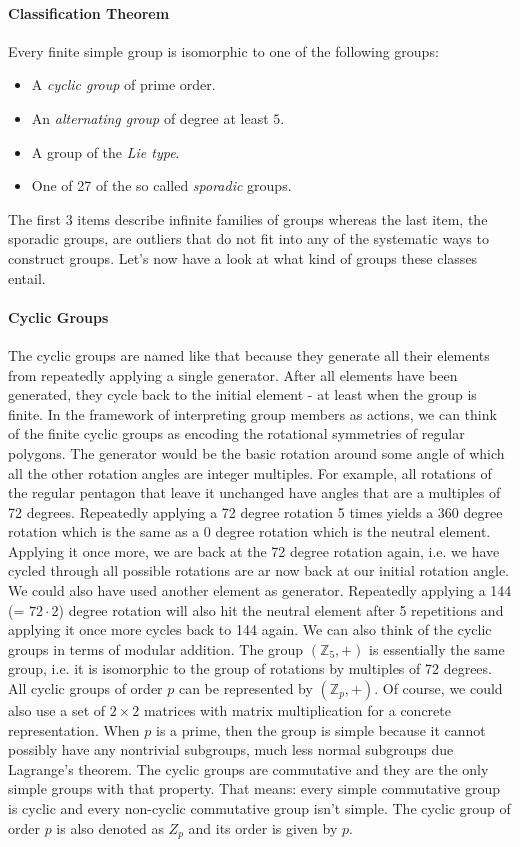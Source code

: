 \paragraph{Classification Theorem}
Every finite simple group is isomorphic to one of the following groups:
\begin{itemize}
\item A \emph{cyclic group} of prime order.
\item An \emph{alternating group} of degree at least $5$.
\item A group of the \emph{Lie type}.
\item One of 27 of the so called \emph{sporadic} groups.
\end{itemize}

The first 3 items describe infinite families of groups whereas the last item, the sporadic groups, are outliers that do not fit into any of the systematic ways to construct groups. Let's now have a look at what kind of groups these classes entail.

\paragraph{Cyclic Groups}
The cyclic groups are named like that because they generate all their elements from repeatedly applying a single generator. After all elements have been generated, they cycle back to the initial element - at least when the group is finite. In the framework of interpreting group members as actions, we can think of the finite cyclic groups as encoding the rotational symmetries of regular polygons. The generator would be the basic rotation around some angle of which all the other rotation angles are integer multiples. For example, all rotations of the regular pentagon that leave it unchanged have angles that are a multiples of 72 degrees. Repeatedly applying a 72 degree rotation 5 times yields a 360 degree rotation which is the same as a 0 degree rotation which is the neutral element. Applying it once more, we are back at the  72 degree rotation again, i.e. we have cycled through all possible rotations are ar now back at our initial rotation angle. We could also have used another element as generator. Repeatedly applying a 144 (= $72 \cdot 2$) degree rotation will also hit the neutral element after 5 repetitions and applying it once more cycles back to 144 again. We can also think of the cyclic groups in terms of modular addition. The group $(\mathbb{Z}_5, +)$ is essentially the same group, i.e. it is isomorphic to the group of rotations by multiples of 72 degrees. All cyclic groups of order $p$ can be represented by $(\mathbb{Z}_p, +)$. Of course, we could also use a set of $2 \times 2$ matrices with matrix multiplication for a concrete representation. When $p$ is a prime, then the group is simple because it cannot possibly have any nontrivial subgroups, much less normal subgroups due Lagrange's theorem. The cyclic groups are commutative and they are the only simple groups with that property. That means: every simple commutative group is cyclic and every non-cyclic commutative group isn't simple. The cyclic group of order $p$ is also denoted as $Z_p$ and its order is given by $p$. 

